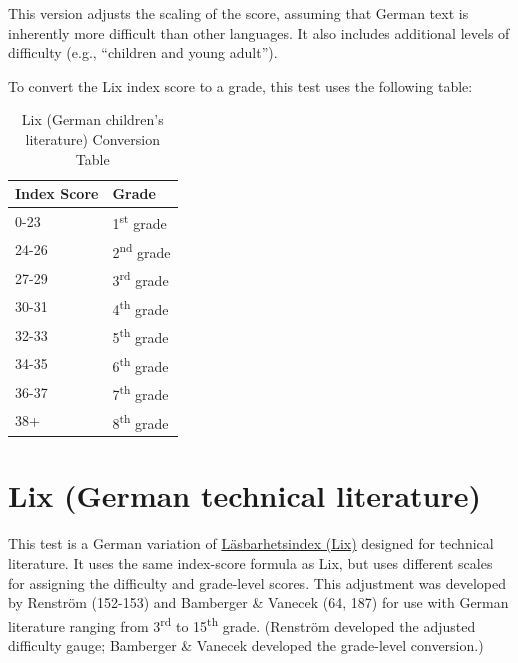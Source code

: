 \documentclass[
]{book}
\theoremstyle{definition}
\theoremstyle{definition}
\theoremstyle{definition}
\theoremstyle{definition}
\theoremstyle{remark}
\begin{document}
This version adjusts the scaling of the score, assuming that German text is inherently more difficult than other languages. It also includes additional levels of difficulty (e.g., ``children and young adult'').

\begin{minipage}{\textwidth}

To convert the Lix index score to a grade, this test uses the following table:

\begin{table}

\caption{\label{tab:unnamed-chunk-21}Lix (German children's literature) Conversion Table}
\centering
\begin{tabular}[t]{ll}
\toprule
Index Score & Grade\\
\midrule
0-23 & 1\textsuperscript{st} grade\\
24-26 & 2\textsuperscript{nd} grade\\
27-29 & 3\textsuperscript{rd} grade\\
30-31 & 4\textsuperscript{th} grade\\
32-33 & 5\textsuperscript{th} grade\\
34-35 & 6\textsuperscript{th} grade\\
36-37 & 7\textsuperscript{th} grade\\
38+ & 8\textsuperscript{th} grade\\
\bottomrule
\end{tabular}
\end{table}

\end{minipage}

\newpage

\hypertarget{lix-german-technical}{%
\section{\texorpdfstring{Lix (German technical literature)}{Lix (German technical literature)}}\label{lix-german-technical}}

This test is a German variation of \protect\hyperlink{lix-test}{Läsbarhetsindex (Lix)} designed for technical literature. It uses the same index-score formula as Lix, but uses different scales for assigning the difficulty and grade-level scores. This adjustment was developed by Renström (152-153) and Bamberger \& Vanecek (64, 187) for use with German literature ranging from 3\textsuperscript{rd} to 15\textsuperscript{th} grade. (Renström developed the adjusted difficulty gauge; Bamberger \& Vanecek developed the grade-level conversion.)
\end{document}

